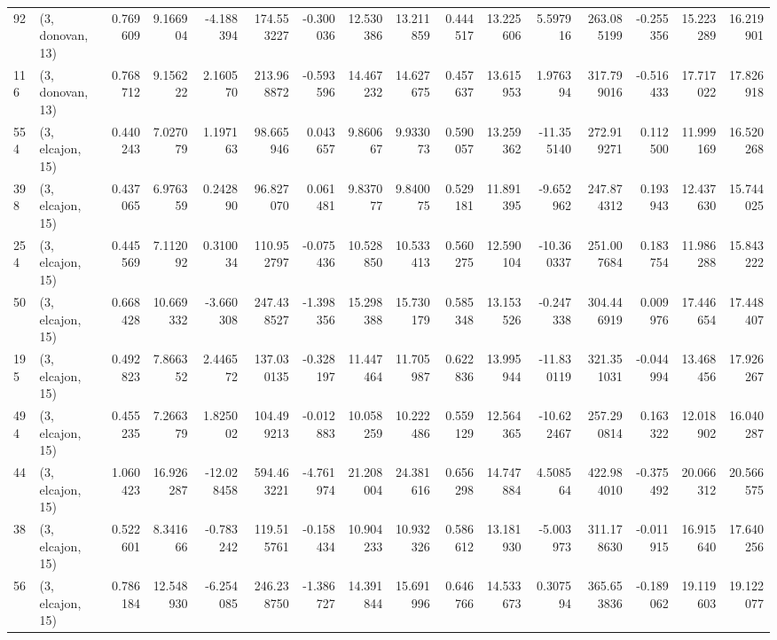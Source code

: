 \begin{tabular}{llrrrrrrrrrrrrrr}
92  &  (3, donovan, 13) &   0.769609 &   9.166904 &  -4.188394 &   174.553227 &  -0.300036 &  12.530386 &  13.211859 &  0.444517 &  13.225606 &   5.597916 &   263.085199 & -0.255356 &  15.223289 &  16.219901 \\
116 &  (3, donovan, 13) &   0.768712 &   9.156222 &   2.160570 &   213.968872 &  -0.593596 &  14.467232 &  14.627675 &  0.457637 &  13.615953 &   1.976394 &   317.799016 & -0.516433 &  17.717022 &  17.826918 \\
554 &  (3, elcajon, 15) &   0.440243 &   7.027079 &   1.197163 &    98.665946 &   0.043657 &   9.860667 &   9.933073 &  0.590057 &  13.259362 & -11.355140 &   272.919271 &  0.112500 &  11.999169 &  16.520268 \\
398 &  (3, elcajon, 15) &   0.437065 &   6.976359 &   0.242890 &    96.827070 &   0.061481 &   9.837077 &   9.840075 &  0.529181 &  11.891395 &  -9.652962 &   247.874312 &  0.193943 &  12.437630 &  15.744025 \\
254 &  (3, elcajon, 15) &   0.445569 &   7.112092 &   0.310034 &   110.952797 &  -0.075436 &  10.528850 &  10.533413 &  0.560275 &  12.590104 & -10.360337 &   251.007684 &  0.183754 &  11.986288 &  15.843222 \\
50  &  (3, elcajon, 15) &   0.668428 &  10.669332 &  -3.660308 &   247.438527 &  -1.398356 &  15.298388 &  15.730179 &  0.585348 &  13.153526 &  -0.247338 &   304.446919 &  0.009976 &  17.446654 &  17.448407 \\
195 &  (3, elcajon, 15) &   0.492823 &   7.866352 &   2.446572 &   137.030135 &  -0.328197 &  11.447464 &  11.705987 &  0.622836 &  13.995944 & -11.830119 &   321.351031 & -0.044994 &  13.468456 &  17.926267 \\
494 &  (3, elcajon, 15) &   0.455235 &   7.266379 &   1.825002 &   104.499213 &  -0.012883 &  10.058259 &  10.222486 &  0.559129 &  12.564365 & -10.622467 &   257.290814 &  0.163322 &  12.018902 &  16.040287 \\
44  &  (3, elcajon, 15) &   1.060423 &  16.926287 & -12.028458 &   594.463221 &  -4.761974 &  21.208004 &  24.381616 &  0.656298 &  14.747884 &   4.508564 &   422.984010 & -0.375492 &  20.066312 &  20.566575 \\
38  &  (3, elcajon, 15) &   0.522601 &   8.341666 &  -0.783242 &   119.515761 &  -0.158434 &  10.904233 &  10.932326 &  0.586612 &  13.181930 &  -5.003973 &   311.178630 & -0.011915 &  16.915640 &  17.640256 \\
56  &  (3, elcajon, 15) &   0.786184 &  12.548930 &  -6.254085 &   246.238750 &  -1.386727 &  14.391844 &  15.691996 &  0.646766 &  14.533673 &   0.307594 &   365.653836 & -0.189062 &  19.119603 &  19.122077 \\

\end{tabular}
